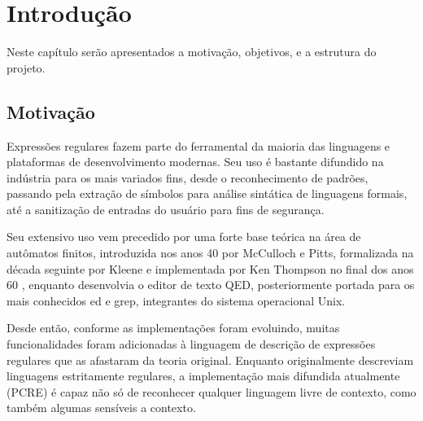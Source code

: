 \documentclass[a4paper,12pt,oneside,onecolumn]{uerj}
\begin{document}




\sumario


\mainmatter

\chapter{Introdução}

Neste capítulo serão apresentados a motivação, objetivos, e a estrutura do projeto.

\section{Motivação}

Expressões regulares fazem parte do ferramental da maioria das linguagens e plataformas de desenvolvimento modernas. Seu uso é bastante difundido na indústria para os mais variados fins, desde o reconhecimento de padrões, passando pela extração de símbolos para análise sintática de linguagens formais, até a sanitização de entradas do usuário para fins de segurança.

Seu extensivo uso vem precedido por uma forte base teórica na área de autômatos finitos, introduzida nos anos 40 por McCulloch e Pitts, formalizada na década seguinte por Kleene e implementada por Ken Thompson no final dos anos 60 \cite{bib:Thompson68}, enquanto desenvolvia o editor de texto QED, posteriormente portada para os mais conhecidos ed e grep, integrantes do sistema operacional Unix.

Desde então, conforme as implementações foram evoluindo, muitas funcionalidades foram adicionadas à linguagem de descrição de expressões regulares que as afastaram da teoria original. Enquanto originalmente descreviam linguagens estritamente regulares, a implementação mais difundida atualmente (PCRE) é capaz não só de reconhecer qualquer linguagem livre de contexto, como também algumas sensíveis a contexto. 
\end{document}
